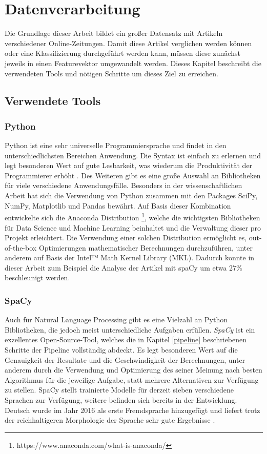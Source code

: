 \chapter{Datenverarbeitung}
Die Grundlage dieser Arbeit bildet ein großer Datensatz mit Artikeln verschiedener Online-Zeitungen. Damit diese Artikel verglichen werden können oder eine Klassifizierung durchgeführt werden kann, müssen diese zunächst jeweils in einen Featurevektor umgewandelt werden. Dieses Kapitel beschreibt die verwendeten Tools und nötigen Schritte um dieses Ziel zu erreichen.

\section{Verwendete Tools}

\subsection{Python}\label{python}
Python ist eine sehr universelle Programmiersprache und findet in den unterschiedlichsten Bereichen Anwendung. Die Syntax ist einfach zu erlernen und legt besonderen Wert auf gute Lesbarkeit, was wiederum die Produktivität der Programmierer erhöht \cite{pythonSummary}. Des Weiteren gibt es eine große Auswahl an Bibliotheken für viele verschiedene Anwendungsfälle. Besonders in der wissenschaftlichen Arbeit hat sich die Verwendung von Python zusammen mit den Packages SciPy, NumPy, Matplotlib und Pandas bewährt. Auf Basis dieser Kombination entwickelte sich die Anaconda Distribution \footnote{https://www.anaconda.com/what-is-anaconda/}, welche die wichtigsten Bibliotheken für Data Science und Machine Learning beinhaltet und die Verwaltung dieser pro Projekt erleichtert. Die Verwendung einer solchen Distribution ermöglicht es, out-of-the-box Optimierungen mathematischer Berechnungen durchzuführen, unter anderem auf Basis der Intel™ Math Kernel Library (MKL). Dadurch konnte in dieser Arbeit zum Beispiel die Analyse der Artikel mit spaCy um etwa 27\% beschleunigt werden.

\subsection{SpaCy}
Auch für Natural Language Processing gibt es eine Vielzahl an Python Bibliotheken, die jedoch meist unterschiedliche Aufgaben erfüllen. \emph{SpaCy} ist ein exzellentes Open-Source-Tool, welches die in Kapitel \ref{pipeline} beschriebenen Schritte der Pipeline vollständig abdeckt. Es legt besonderen Wert auf die Genauigkeit der Resultate und die Geschwindigkeit der Berechnungen, unter anderem durch die Verwendung und Optimierung des seiner Meinung nach besten Algorithmus für die jeweilige Aufgabe, statt mehrere Alternativen zur Verfügung zu stellen. SpaCy stellt trainierte Modelle für derzeit sieben verschiedene Sprachen zur Verfügung, weitere befinden sich bereits in der Entwicklung. Deutsch wurde im Jahr 2016 als erste Fremdsprache hinzugefügt und liefert trotz der reichhaltigeren Morphologie der Sprache sehr gute Ergebnisse \cite{spacyGerman}.

